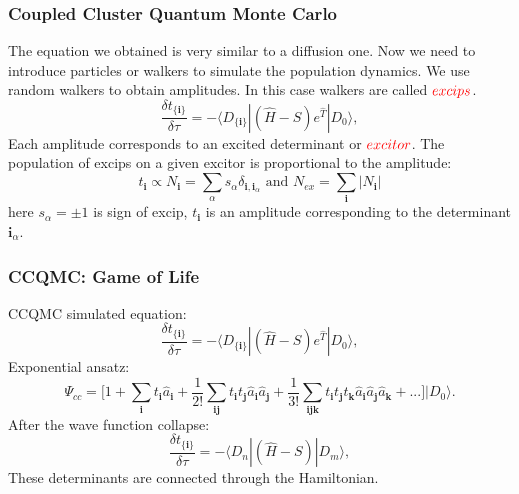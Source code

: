 \documentclass{beamer}
\begin{document}
\begin{frame}
\frametitle{Coupled Cluster Quantum Monte Carlo}
The equation we obtained is very similar to a diffusion one. Now we need to introduce particles or walkers to simulate the population dynamics. We use random walkers to obtain amplitudes. In this case walkers are called ${\color{red}excips}$. 
\begin{equation*}	
\frac{\delta t_{\{\boldsymbol{i}\}}}{\delta\tau} = -\langle D_{\{\boldsymbol{i}\}}|(\hat{H}-S)e^{\hat{T}}|D_0\rangle,
\end{equation*}
Each amplitude corresponds to an excited determinant or ${\color{red}excitor}$. The population of excips on a given excitor is proportional to the amplitude:
\begin{equation*}	
t_{\boldsymbol{i}} \propto N_{\boldsymbol{i}} = \sum_\alpha s_\alpha \delta_{{\boldsymbol{i}}, {\boldsymbol{i}}_\alpha} \text{ and }  N_{ex} = \sum_{\boldsymbol{i}} |N_{\boldsymbol{i}}|
\end{equation*}
here $s_\alpha = \pm 1$ is sign of excip, $t_{\boldsymbol{i}}$ is an amplitude corresponding to the determinant ${{\boldsymbol{i}}_\alpha}$. %
\end{frame}

\begin{frame}
\frametitle{CCQMC: Game of Life}
CCQMC simulated equation:
\begin{equation*}	
\frac{\delta t_{\{\boldsymbol{i}\}}}{\delta\tau} = -\langle D_{\{\boldsymbol{i}\}}|(\hat{H}-S)e^{\hat{T}}|D_0\rangle,
\end{equation*}
Exponential ansatz:
\begin{equation*}
\Psi_{cc} = \big[1 + \sum_{\boldsymbol{i}} t_{\boldsymbol{i}}\hat{a}_{\boldsymbol{i}} + \frac{1}{ 2!}\sum_{\boldsymbol{ij}} t_{\boldsymbol{i}} t_{\boldsymbol{j}} \hat{a}_{\boldsymbol{i}} \hat{a}_{\boldsymbol{j}} + \frac{1}{ 3!}\sum_{\boldsymbol{ijk}}t_{\boldsymbol{i}} t_{\boldsymbol{j}} t_{\boldsymbol{k}} \hat{a}_{\boldsymbol{i}} \hat{a}_{\boldsymbol{j}} \hat{a}_{\boldsymbol{k}} + ...  \big]|D_0\rangle.
\end{equation*}
After the wave function collapse:
\begin{equation*}	
\frac{\delta t_{\{\boldsymbol{i}\}}}{\delta\tau} = -\langle D_n|(\hat{H}-S)|D_m\rangle,
\end{equation*}
These determinants are connected through the Hamiltonian.
\end{frame}
\end{document}
